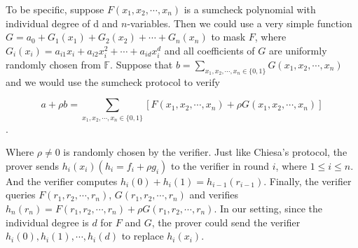To be specific, suppose $F(x_1, x_2, \cdots, x_n)$ is a sumcheck polynomial with individual degree of d and $n$-variables. Then we could use a very simple function $G = a_{0} + G_1(x_1) + G_2(x_2) + \cdots + G_n(x_n)$ to mask $F$, where $G_{i}(x_i) = a_{i1}x_i + a_{i2}x_i^2 + \cdots + a_{id}x_i^d$ and all coefficients of $G$ are uniformly randomly chosen from $\mathbb{F}$. Suppose that $b = \sum\limits_{x_1, x_2, \cdots, x_n \in \{0, 1\}}G(x_1, x_2, \cdots, x_n)$ and we would use the sumcheck protocol to verify

$$a + \rho b = \sum\limits_{x_1, x_2, \cdots, x_n \in \{0, 1\}}[F(x_1, x_2, \cdots, x_n) + \rho G(x_1, x_2, \cdots, x_n)]$$. 

Where $\rho \neq 0$ is randomly chosen by the verifier. Just like Chiesa's protocol, the prover sends $h_i(x_i)(h_i = f_i + \rho g_i)$ to the verifier in round $i$, where $1 \leq i \leq n$. And the verifier computes $h_i(0) + h_i(1) = h_{i-1}(r_{i-1})$. Finally, the verifier queries $F(r_1, r_2, \cdots, r_n)$, $G(r_1, r_2, \cdots, r_n)$ and verifies $h_n(r_n) = F(r_1, r_2, \cdots, r_n) + \rho G(r_1, r_2, \cdots, r_n)$. In our setting, since the individual degree is $d$ for $F$ and $G$, the prover could send the verifier $h_i(0), h_i(1), \cdots, h_i(d)$ to replace $h_i(x_i)$.\\

